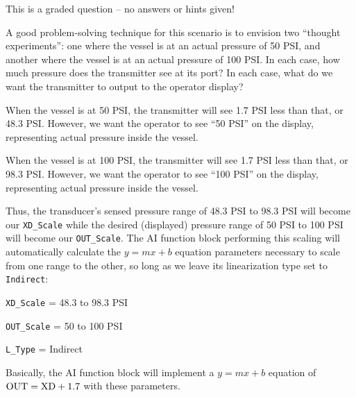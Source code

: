 This is a graded question -- no answers or hints given!







A good problem-solving technique for this scenario is to envision two ``thought experiments'': one where the vessel is at an actual pressure of 50 PSI, and another where the vessel is at an actual pressure of 100 PSI.  In each case, how much pressure does the transmitter see at its port?  In each case, what do we want the transmitter to output to the operator display?

\vskip 10pt

When the vessel is at 50 PSI, the transmitter will see 1.7 PSI less than that, or 48.3 PSI.  However, we want the operator to see ``50 PSI'' on the display, representing actual pressure inside the vessel.

\vskip 10pt

When the vessel is at 100 PSI, the transmitter will see 1.7 PSI less than that, or 98.3 PSI.  However, we want the operator to see ``100 PSI'' on the display, representing actual pressure inside the vessel.

\vskip 10pt

Thus, the transducer's sensed pressure range of 48.3 PSI to 98.3 PSI will become our {\tt XD\_Scale} while the desired (displayed) pressure range of 50 PSI to 100 PSI will become our {\tt OUT\_Scale}.  The AI function block performing this scaling will automatically calculate the $y = mx + b$ equation parameters necessary to scale from one range to the other, so long as we leave its linearization type set to {\tt Indirect}:

\vskip 10pt

{\tt XD\_Scale} = 48.3 to 98.3 PSI

\vskip 10pt

{\tt OUT\_Scale} = 50 to 100 PSI

\vskip 10pt

{\tt L\_Type} = Indirect

\vskip 10pt

Basically, the AI function block will implement a $y = mx + b$ equation of $\hbox{OUT} = \hbox{XD} + 1.7$ with these parameters.



